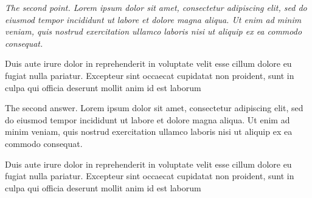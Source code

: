 \documentclass[11pt]{article}
\newenvironment{RC}{\itshape}{\par\noindent}
\newenvironment{AC}{\normalfont\color{Blue}}{\par\vspace{0.25cm}}
\begin{document}
\begin{RC}
  The second point. Lorem ipsum dolor sit amet, consectetur adipiscing elit, sed do eiusmod tempor incididunt ut labore et dolore magna aliqua. Ut enim ad minim veniam, quis nostrud exercitation ullamco laboris nisi ut aliquip ex ea commodo consequat.
  
  Duis aute irure dolor in reprehenderit in voluptate velit esse cillum dolore eu fugiat nulla pariatur. Excepteur sint occaecat cupidatat non proident, sunt in culpa qui officia deserunt mollit anim id est laborum
\end{RC}
\begin{AC}
  The second answer. Lorem ipsum dolor sit amet, consectetur adipiscing elit, sed do eiusmod tempor incididunt ut labore et dolore magna aliqua. Ut enim ad minim veniam, quis nostrud exercitation ullamco laboris nisi ut aliquip ex ea commodo consequat.
  
  Duis aute irure dolor in reprehenderit in voluptate velit esse cillum dolore eu fugiat nulla pariatur. Excepteur sint occaecat cupidatat non proident, sunt in culpa qui officia deserunt mollit anim id est laborum
\end{AC}
\end{document}
